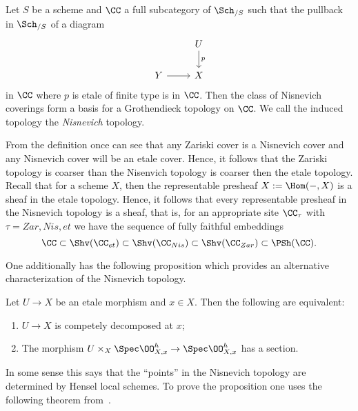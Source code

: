 \documentclass[12pt]{article}
\numberwithin{equation}{section}
\numberwithin{lemma}{section}
\numberwithin{theorem}{section}
\numberwithin{proposition}{section}
\numberwithin{corollary}{section}
\numberwithin{definition}{section}
\numberwithin{example}{section}
\numberwithin{remark}{section}
\begin{document}
\begin{proposition}
  Let $S$ be a scheme and $\CC$ a full subcategory of $\Sch_{/S}$
  such that the pullback in $\Sch_{/S}$ of a diagram
  \begin{equation*}
    \begin{tikzcd}
      & U \arrow[d, "p"] \\
      Y \arrow[r] & X
    \end{tikzcd}
  \end{equation*}
  in $\CC$ where $p$ is etale of finite type is in $\CC$. Then the
  class of Nisnevich coverings form a basis for a Grothendieck
  topology on $\CC$. We call the induced topology the \emph{Nisnevich}
  topology.
\end{proposition}

From the definition once can see that any Zariski cover is a Nisnevich
cover and any Nisnevich cover will be an etale cover. Hence, it
follows that the Zariski topology is coarser than the Nisenvich
topology is coarser then the etale topology. Recall that for a scheme
$X$, then the representable presheaf $X := \Hom(-, X)$ is a sheaf in
the etale topology. Hence, it follows that every representable
presheaf in the Nisnevich topology is a sheaf, that is, for an
appropriate site $\CC_\tau$ with $\tau = Zar, Nis, et$ we have the
sequence of fully faithful embeddings
\begin{equation*}
  \CC \subset \Shv(\CC_{et}) \subset \Shv(\CC_{Nis}) \subset \Shv(\CC_{Zar}) \subset \PSh(\CC).
\end{equation*}

One additionally has the following proposition which provides an
alternative characterization of the Nisnevich topology.
\begin{proposition}\label{prop:alternative-nisnevich-condition}
  Let $U \to X$ be an etale morphism and $x \in X$. Then the following
  are equivalent:
  \begin{enumerate}[label=(\arabic*)]
  \item $U \to X$ is competely decomposed at $x$;
  \item The morphism
    $U \times_X \Spec \OO^h_{X, x} \to \Spec \OO^h_{X, x}$ has a
    section.
  \end{enumerate}
\end{proposition}

In some sense this says that the ``points'' in the Nisnevich topology
are determined by Hensel local schemes. To prove the proposition one
uses the following theorem from~\cite{milne1980etale}.
\end{document}
